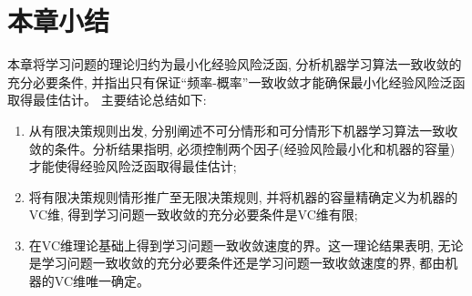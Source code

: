\section{本章小结}
本章将学习问题的理论归约为最小化经验风险泛函, 分析机器学习算法一致收敛的充分必要条件, 并指出只有保证“频率-概率”一致收敛才能确保最小化经验风险泛函取得最佳估计。 主要结论总结如下:
\begin{enumerate}
\item 从有限决策规则出发, 分别阐述不可分情形和可分情形下机器学习算法一致收敛的条件。分析结果指明, 必须控制两个因子(经验风险最小化和机器的容量)才能使得经验风险泛函取得最佳估计;
\item 将有限决策规则情形推广至无限决策规则, 并将机器的容量精确定义为机器的VC维, 得到学习问题一致收敛的充分必要条件是VC维有限;
\item 在VC维理论基础上得到学习问题一致收敛速度的界。这一理论结果表明, 无论是学习问题一致收敛的充分必要条件还是学习问题一致收敛速度的界, 都由机器的VC维唯一确定。
\end{enumerate}